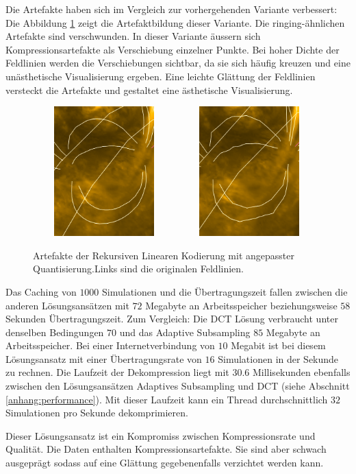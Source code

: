Die Artefakte haben sich im Vergleich zur vorhergehenden Variante verbessert: Die Abbildung \ref{resultate:loesung2:adaptive:median_extra:artefakte} zeigt die Artefaktbildung dieser Variante. Die ringing-ähnlichen Artefakte sind verschwunden. In dieser Variante äussern sich Kompressionsartefakte als Verschiebung einzelner Punkte. Bei hoher Dichte der Feldlinien werden die Verschiebungen sichtbar, da sie sich häufig kreuzen und eine unästhetische Visualisierung ergeben. Eine leichte Glättung der Feldlinien versteckt die Artefakte und gestaltet eine ästhetische Visualisierung.

\begin{figure}[!htbp]
	\center
		\includegraphics[width=0.49\textwidth,height=5cm,keepaspectratio]{./pictures/resultate/loesung2/variante3/no_artifacts.png}
	\includegraphics[width=0.49\textwidth,height=5cm,keepaspectratio]{./pictures/resultate/loesung2/variante3/artifacts_extra.png}
	\caption{Artefakte der Rekursiven Linearen Kodierung mit angepasster Quantisierung.Links sind die originalen Feldlinien.}
	\label{resultate:loesung2:adaptive:median_extra:artefakte}
\end{figure}

Das Caching von $1000$ Simulationen und die Übertragungszeit fallen zwischen die anderen Lösungsansätzen mit $72$ Megabyte an Arbeitsspeicher beziehungsweise $58$ Sekunden Übertragungszeit. Zum Vergleich: Die DCT Lösung verbraucht unter denselben Bedingungen $70$ und das Adaptive Subsampling $85$ Megabyte an Arbeitsspeicher. Bei einer Internetverbindung von $10$ Megabit ist bei diesem Lösungsansatz mit einer Übertragungsrate von $16$ Simulationen in der Sekunde zu rechnen. Die Laufzeit der Dekompression liegt mit $30.6$ Millisekunden ebenfalls zwischen den Lösungsansätzen Adaptives Subsampling und DCT (siehe Abschnitt \ref{anhang:performance}). Mit dieser Laufzeit kann ein Thread durchschnittlich $32$ Simulationen pro Sekunde dekomprimieren.

Dieser Lösungsansatz ist ein Kompromiss zwischen Kompressionsrate und Qualität. Die Daten enthalten Kompressionsartefakte. Sie sind aber schwach ausgeprägt sodass auf eine Glättung gegebenenfalls verzichtet werden kann.